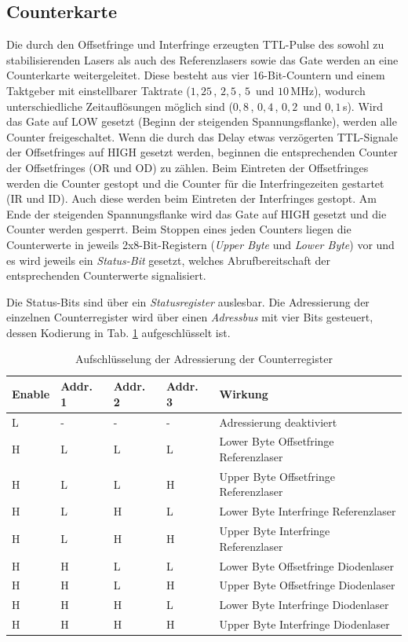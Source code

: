 \subsection{Counterkarte}\label{subsec:counterkarte}
Die durch den Offsetfringe und Interfringe erzeugten
TTL-Pulse des sowohl zu stabilisierenden Lasers als auch des Referenzlasers
sowie das Gate werden an eine Counterkarte weitergeleitet. Diese besteht aus
vier 16-Bit-Countern und einem Taktgeber mit einstellbarer Taktrate ($1,25\,$,
$2,5\,$, $5\,$ und $10\,$MHz), wodurch unterschiedliche Zeitauflösungen möglich
sind ($0,8\,$, $0,4\,$, $0,2\,$ und $0,1\,$\textmu s).
Wird das Gate auf LOW gesetzt (Beginn der steigenden Spannungsflanke), werden
alle Counter freigeschaltet. Wenn die durch
das Delay etwas verzögerten TTL-Signale der Offsetfringes auf HIGH gesetzt werden, beginnen die
entsprechenden Counter der Offsetfringes (OR und OD) zu zählen. Beim Eintreten
der Offsetfringes werden die Counter gestopt und die Counter für die
Interfringezeiten gestartet (IR und ID). Auch diese werden beim Eintreten der
Interfringes gestopt. Am Ende der steigenden Spannungsflanke wird das Gate auf
HIGH gesetzt und die Counter werden gesperrt. Beim Stoppen eines jeden Counters
liegen die Counterwerte in jeweils 2x8-Bit-Registern (\textit{Upper Byte} und \textit{Lower Byte}) vor und es wird jeweils ein
\textit{Status-Bit} gesetzt, welches Abrufbereitschaft der entsprechenden
Counterwerte signalisiert.\par
Die Status-Bits sind über ein \textit{Statusregister} auslesbar. Die
Adressierung der einzelnen Counterregister wird über einen \textit{Adressbus} mit vier Bits
gesteuert, dessen Kodierung in Tab. \ref{tab:adressbus_kodierung} aufgeschlüsselt ist.
\begin{table}
	\begin{tabular}{p{}p{}p{}p{}|p{}}
		\toprule
		Enable & Addr. 1 & Addr. 2 & Addr. 3 & Wirkung\\
		\midrule[1px]
		\hline
		L & - & - & - & Adressierung deaktiviert\\
		H & L & L & L & Lower Byte Offsetfringe Referenzlaser\\
		H & L & L & H & Upper Byte Offsetfringe Referenzlaser\\
		H & L & H & L & Lower Byte Interfringe Referenzlaser\\
		H & L & H & H & Upper Byte Interfringe Referenzlaser\\
		H & H & L & L & Lower Byte Offsetfringe Diodenlaser\\
		H & H & L & H & Upper Byte Offsetfringe Diodenlaser\\
		H & H & H & L & Lower Byte Interfringe Diodenlaser\\
		H & H & H & H & Upper Byte Interfringe Diodenlaser\\
		\bottomrule[1px]
	\end{tabular}
	\caption[Adressierung Counterregister]{Aufschlüsselung der Adressierung der
	Counterregister}
	\label{tab:adressbus_kodierung}
\end{table}
